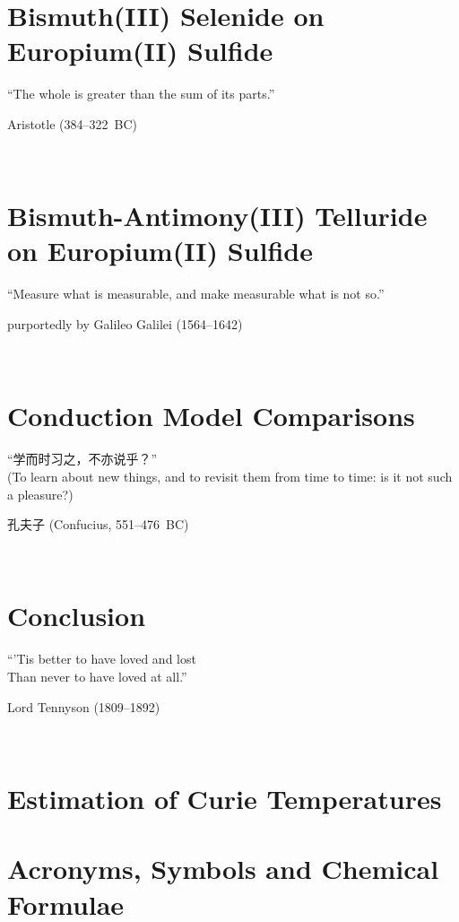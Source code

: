 ﻿\documentclass{report}
\begin{document}
\chapter{Bismuth(III) Selenide on Europium(II) Sulfide}\label{ch:bilayer2014}
\epigraph{``The whole is greater than the sum of its parts.''}{Aristotle (384--322~BC)}~\\
    

\chapter{Bismuth-Antimony(III) Telluride on Europium(II) Sulfide}\label{ch:bilayer2018}
\epigraph{``Measure what is measurable, and make measurable what is not so.''}{purportedly by Galileo Galilei (1564--1642)}~\\
    

\chapter{Conduction Model Comparisons}\label{ch:models}
    \begin{CJK*}{UTF8}{gkai}
    \epigraph{``学而时习之，不亦说乎？''\\(To learn about new things, and to revisit them from time to time: is it not such a pleasure?)}{孔夫子 (Confucius, 551--476~BC)}~\\
    \end{CJK*}
    

\chapter{Conclusion}\label{ch:conclusion}
\epigraph{``'Tis better to have loved and lost\\Than never to have loved at all.''}{Lord Tennyson (1809--1892)}~\\
    
\appendix
%
%
\chapter{Estimation of Curie Temperatures}\label{ap:curie}
    
\chapter{Acronyms, Symbols and Chemical Formulae}
    
    
\printbibliography[heading=bibintoc]
\end{document}
